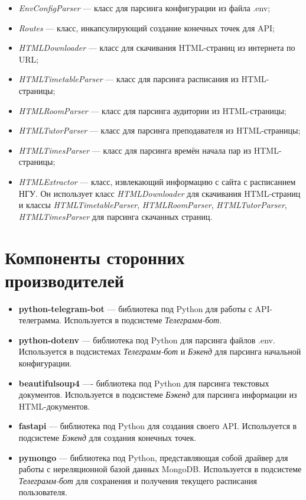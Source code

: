			\begin{itemize}
				\item \textit{EnvConfigParser} --- класс для парсинга конфигурации из файла .env;
				
				\item \textit{Routes} --- класс, инкапсулирующий создание конечных точек для API;
				
				\item \textit{HTMLDownloader} --- класс для скачивания HTML-страниц из интернета по URL;
				
				\item \textit{HTMLTimetableParser} --- класс для парсинга расписания из HTML-страницы;
				
				\item \textit{HTMLRoomParser} --- класс для парсинга аудитории из HTML-страницы;
				
				\item \textit{HTMLTutorParser} --- класс для парсинга преподавателя из HTML-страницы;
				
				\item \textit{HTMLTimesParser} --- класс для парсинга времён начала пар из HTML-страницы;
				
				\item \textit{HTMLExtractor} --- класс, извлекающий информацию с сайта с расписанием НГУ. Он использует класс \textit{HTMLDownloader} для скачивания HTML-страниц и классы \textit{HTMLTimetableParser}, \textit{HTMLRoomParser}, \textit{HTMLTutorParser}, \textit{HTMLTimesParser} для парсинга скачанных страниц.
			\end{itemize}
	\section{Компоненты сторонних производителей}
		\begin{itemize}
			\item \textbf{python-telegram-bot} --- библиотека под Python для работы с API-телеграмма. Используется в подсистеме \textit{Телеграмм-бот}.
			
			\item \textbf{python-dotenv} --- библиотека под Python для парсинга файлов .env. Используется в подсистемах \textit{Телеграмм-бот} и \textit{Бэкенд} для парсинга начальной конфигурации.
			
			\item \textbf{beautifulsoup4} ---- библиотека под Python для парсинга текстовых документов. Используется в подсистеме \textit{Бэкенд} для парсинга информации из HTML-документов.
			
			\item \textbf{fastapi} --- библиотека под Python для создания своего API. Используется в подсистеме \textit{Бэкенд} для создания конечных точек.
			
			\item \textbf{pymongo} --- библиотека под Python, представляющая собой драйвер для работы с нереляционной базой данных MongoDB. Используется в подсистеме \textit{Телеграмм-бот} для сохранения и получения текущего расписания пользователя.
		\end{itemize}
